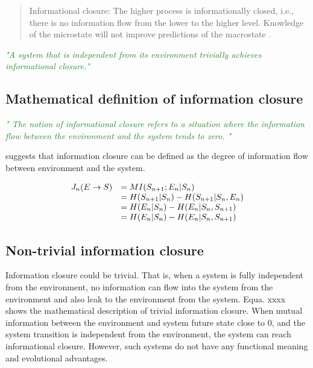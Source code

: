 \documentclass[utf8]{article}
\newcommand{\rewrite}[1]{\textcolor{ForestGreen}{\textit{"#1"}}\newline}
\begin{document}
		
		\begin{quotation}
			Informational closure: The higher process is informationally closed, i.e., there is no information flow from the lower to the higher level. Knowledge of the microstate will not improve predictions of the macrostate \citep[p. 4]{PFANTE.2014}.
		\end{quotation}
		
		
		\rewrite{A system that is independent from its environment trivially achieves informational 
			closure.}
		\citep{BERTSCHINGER.2006}
		
		
		
		\subsection{Mathematical definition of information closure}
			\rewrite{
				The notion of informational closure refers to a situation where the information flow between the environment and the system tends to zero.
			}\cite{BERTSCHINGER.2006}
		
			suggests that information closure can be defined as the degree of information flow between environment and the system. 
	
		
		\begin{equation}
			 \left.\begin{array} { r l } { J _ { n } ( E \rightarrow S ) } & { = M I ( S _ { n + 1} ; E _ { n } | S _ { n } ) } \\ { } & { = H ( S _ { n + 1} | S _ { n } ) - H ( S _ { n + 1} | S _ { n } ,E _ { n } ) } \\ { } & { = H ( E _ { n } | S _ { n } ) - H ( E _ { n } | S _ { n } ,S _ { n + 1} ) } \\ { } & { = H ( E _ { n } | S _ { n } ) - H ( E _ { n } | S _ { n } ,S _ { n + 1} ) } \end{array} \right.
		\end{equation}
		
		
		
		
		
		\subsection{Non-trivial information closure}
			Information closure could be trivial. That is, when a system is fully independent from the environment, no information can flow into the system from the environment and also leak to the environment from the system. Equa. xxxx shows the mathematical description of trivial information closure. When mutual information between the environment and system future state close to 0, and the system transition is independent from the environment, the system can reach informational closure. However, such systems do not have any functional meaning and evolutional advantages.
			
\end{document}
